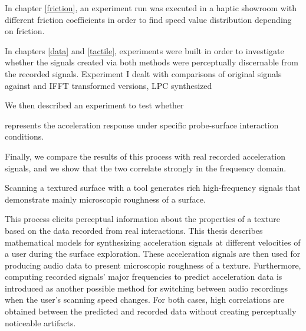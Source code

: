 In chapter \ref{friction}, an experiment run was executed in a haptic showroom with different friction coefficients in order to find speed value distribution depending on friction. 

In chapters \ref{data} and \ref{tactile}, experiments were built in order to investigate whether the signals created via both methods were perceptually discernable from the recorded signals. Experiment I dealt with comparisons of original signals against and IFFT transformed versions, LPC synthesized



We then described an experiment to test whether



 represents the acceleration response
under specific probe-surface interaction conditions.

Finally, we compare the results of this process with real recorded acceleration
signals, and we show that the two correlate strongly in the frequency domain.

Scanning a textured surface with a tool generates rich high-frequency signals that demonstrate mainly microscopic roughness of a surface.

  This process elicits perceptual information about the properties of a texture based on the data recorded from real interactions. This thesis describes mathematical models for synthesizing acceleration signals at different velocities of a user during the surface exploration. These acceleration signals are then used for producing audio data to present microscopic roughness of a texture.  Furthermore, computing recorded signals' major frequencies to predict acceleration data is introduced as another possible method for switching between audio recordings when the user's scanning speed changes. For both cases, high correlations are obtained between the predicted and recorded data without creating perceptually noticeable artifacts.